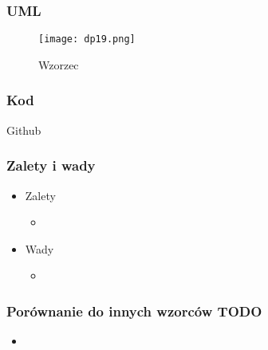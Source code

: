 \documentclass[a4paper,15pt]{article}
\begin{document}
\subsubsection{UML}

\begin{figure}[H]
\centering
  \texttt{[image: dp19.png]}
  \caption{Wzorzec }
\end{figure}

\subsubsection{Kod}
Github

\subsubsection{Zalety i wady}


\begin{itemize}
\item Zalety
\begin{itemize}
\item 
\end{itemize}
\item Wady
\begin{itemize}
\item 
\end{itemize}
\end{itemize}


\subsubsection{Porównanie do innych wzorców TODO}
\begin{itemize}
\item
\end{itemize}
\end{document}
